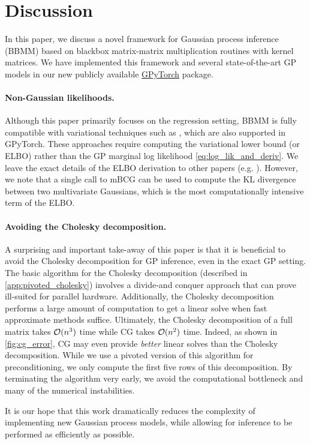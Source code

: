 \section{Discussion}
In this paper, we discuss a novel framework for Gaussian process inference (BBMM) based on blackbox matrix-matrix multiplication routines with kernel matrices.
We have implemented this framework and several state-of-the-art GP models in our new publicly available {\href{https://gpytorch.ai}{GPyTorch}} package.

\paragraph{Non-Gaussian likelihoods.}
Although this paper primarily focuses on the regression setting, BBMM is fully compatible with variational techniques such as \cite{hensman2015scalable,wilson2016stochastic}, which are also supported in GPyTorch.
These approaches require computing the variational lower bound (or ELBO) rather than the GP marginal log likelihood \eqref{eq:log_lik_and_deriv}. We leave the exact details of the ELBO derivation to other papers (e.g. \cite{hensman2015scalable}).
However, we note that a single call to mBCG can be used to compute the KL divergence between two multivariate Gaussians, which is the most computationally intensive term of the ELBO.

\paragraph{Avoiding the Cholesky decomposition.}
A surprising and important take-away of this paper is that it is beneficial to avoid the Cholesky decomposition for GP inference, even in the exact GP setting.
The basic algorithm for the Cholesky decomposition (described in \cref{app:pivoted_cholesky}) involves a divide-and conquer approach that can prove ill-suited for parallel hardware.
Additionally, the Cholesky decomposition performs a large amount of computation to get a linear solve when fast approximate methods suffice.
Ultimately, the Cholesky decomposition of a full matrix takes $\bigo{n^3}$ time while CG takes $\bigo{n^2}$ time.
Indeed, as shown in \cref{fig:cg_error}, CG may even provide \emph{better} linear solves than the Cholesky decomposition.
While we use a pivoted version of this algorithm for preconditioning, we only compute the first five rows of this decomposition.
By terminating the algorithm very early, we avoid the computational bottleneck and many of the numerical instabilities.

It is our hope that this work dramatically reduces the complexity of implementing new Gaussian process models,
while allowing for inference to be performed as efficiently as possible.
